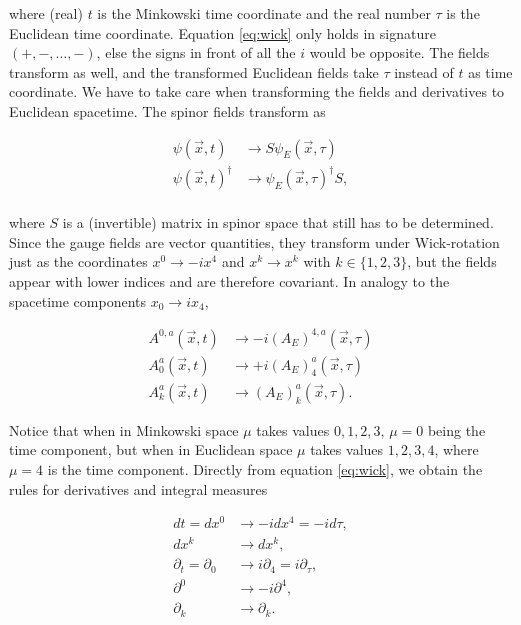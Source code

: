 \documentclass{article}
\theoremstyle{plain} %
\theoremstyle{convention} %
\theoremstyle{remark} %
\numberwithin{equation}{section}
\begin{document}
where (real) $t$ is the Minkowski time coordinate and the real number $\tau$ is the Euclidean time coordinate. Equation \eqref{eq:wick} only holds in signature $(+,-,\dots,-)$, else the signs in front of all the $i$ would be opposite. The fields transform as well, and the transformed Euclidean fields take $\tau$ instead of $t$ as time coordinate. We have to take care when transforming the fields and derivatives to Euclidean spacetime. The spinor fields transform as

\begin{align*}
    \psi(\vec{x}, t) &\longrightarrow S \psi_E(\vec{x}, \tau) \\
    \psi(\vec{x}, t)^{\dagger} &\longrightarrow \psi_E(\vec{x}, \tau)^{\dagger} S, \\
\end{align*}

where $S$ is a (invertible) matrix in spinor space that still has to be determined. Since the gauge fields are vector quantities, they transform under Wick-rotation just as the coordinates $x^0 \to -ix^4$ and $x^k \to x^k$ with $k \in \{1, 2, 3\}$, but the fields appear with lower indices and are therefore covariant. In analogy to the spacetime components $x_0 \to ix_4$,

\begin{align*}
    A^{0,a}(\vec{x}, t) &\longrightarrow - i (A_E)^{4,a}(\vec{x}, \tau) \\
    A_0^a(\vec{x}, t)   &\longrightarrow + i (A_E)_4^a(\vec{x}, \tau) \\
    A_k^a(\vec{x}, t)   &\longrightarrow (A_E)_k^a(\vec{x}, \tau).
\end{align*}

Notice that when in Minkowski space $\mu$ takes values $0, 1, 2, 3$, $\mu = 0$ being the time component, but when in Euclidean space $\mu$ takes values $1, 2, 3, 4$, where $\mu = 4$ is the time component. Directly from equation \eqref{eq:wick}, we obtain the rules for derivatives and integral measures

\begin{align*}
    dt = dx^0 &\longrightarrow - i d x^4 = - i d \tau, \\
    dx^k &\longrightarrow dx^k, \\
    \partial_t = \partial_0 &\longrightarrow i \partial_4 = i \partial_{\tau}, \\
    \partial^0 &\longrightarrow - i \partial^4, \\
    \partial_k &\longrightarrow \partial_k.
\end{align*}
\end{document}
